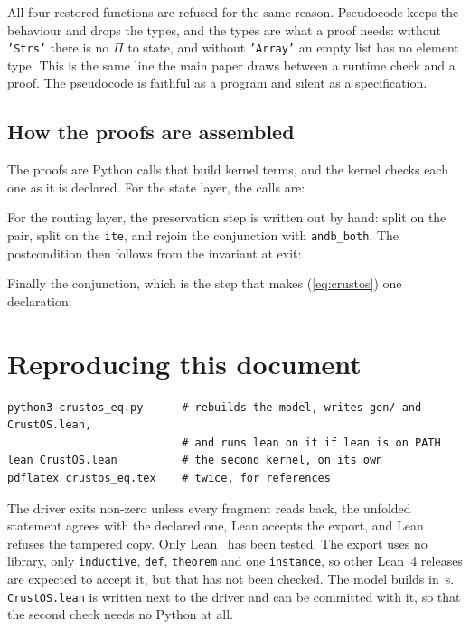 \documentclass[11pt]{article}
\newcommand{\code}[1]{\texttt{#1}}
\begin{document}


All four restored functions are refused for the same reason. Pseudocode keeps
the behaviour and drops the types, and the types are what a proof needs:
without \code{'Strs'} there is no $\Pi$ to state, and without \code{'Array'}
an empty list has no element type. This is the same line the main paper
draws between a runtime check and a proof. The pseudocode is faithful as a
program and silent as a specification.

\subsection{How the proofs are assembled}

The proofs are Python calls that build kernel terms, and the kernel checks
each one as it is declared. For the state layer, the calls are:



For the routing layer, the preservation step is written out by hand: split on
the pair, split on the \code{ite}, and rejoin the conjunction with
\code{andb\_both}. The postcondition then follows from the invariant at exit:



Finally the conjunction, which is the step that makes (\ref{eq:crustos}) one
declaration:



\section{Reproducing this document}
\label{sec:repro}

\begin{lstlisting}[style=plain]
python3 crustos_eq.py      # rebuilds the model, writes gen/ and CrustOS.lean,
                           # and runs lean on it if lean is on PATH
lean CrustOS.lean          # the second kernel, on its own
pdflatex crustos_eq.tex    # twice, for references
\end{lstlisting}
\small
The driver exits non-zero unless every fragment reads back, the unfolded
statement agrees with the declared one, Lean accepts the export, and Lean
refuses the tampered copy. Only Lean~\leanVersion{} has been tested. The
export uses no library, only \code{inductive}, \code{def}, \code{theorem}
and one \code{instance}, so other Lean~4 releases are expected to accept it,
but that has not been checked. The model builds in
\buildSeconds\,s. \code{CrustOS.lean} is written next to the driver and can be
committed with it, so that the second check needs no Python at all.
\end{document}
